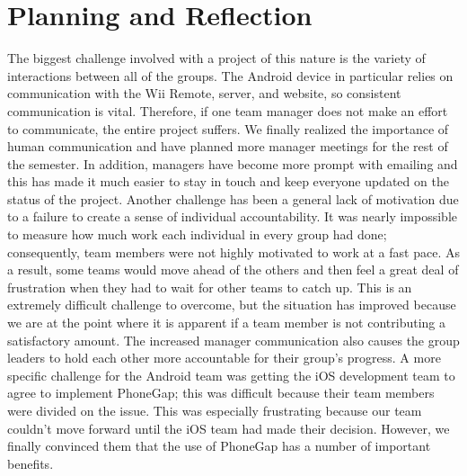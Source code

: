 \documentclass[12pt]{article}
\begin{document}
\section{Planning and Reflection}
The biggest challenge involved with a project of this nature is the variety of interactions between all of the groups.  The Android device in particular relies on communication with the Wii Remote, server, and website, so consistent communication is vital.  Therefore, if one team manager does not make an effort to communicate, the entire project suffers.  We finally realized the importance of human communication and have planned more manager meetings for the rest of the semester.  In addition, managers have become more prompt with emailing and this has made it much easier to stay in touch and keep everyone updated on the status of the project.  Another challenge has been a general lack of motivation due to a failure to create a sense of individual accountability.  It was nearly impossible to measure how much work each individual in every group had done; consequently, team members were not highly motivated to work at a fast pace.  As a result, some teams would move ahead of the others and then feel a great deal of frustration when they had to wait for other teams to catch up.  This is an extremely difficult challenge to overcome, but the situation has improved because we are at the point where it is apparent if a team member is not contributing a satisfactory amount.  The increased manager communication also causes the group leaders to hold each other more accountable for their group’s progress.  A more specific challenge for the Android team was getting the iOS development team to agree to implement PhoneGap; this was difficult because their team members were divided on the issue.  This was especially frustrating because our team couldn’t move forward until the iOS team had made their decision.  However, we finally convinced them that the use of PhoneGap has a number of important benefits.
\end{document}
